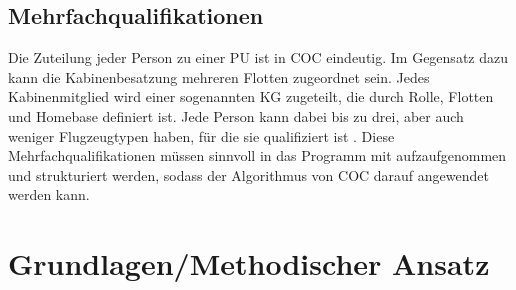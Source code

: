 \documentclass [12pt, a4paper, oneside, titlepage, ngerman]{article}
\begin{document}
\subsection{Mehrfachqualifikationen}
Die Zuteilung jeder Person zu einer \ac{PU} ist in \ac{COC} eindeutig.
Im Gegensatz dazu kann die Kabinenbesatzung mehreren Flotten zugeordnet sein. Jedes Kabinenmitglied wird einer sogenannten \ac{KG} zugeteilt, die durch Rolle, Flotten und Homebase definiert ist. Jede Person kann dabei bis zu drei, aber auch weniger Flugzeugtypen haben, für die sie qualifiziert ist \cite[vgl.][]{Gespraech2}. Diese Mehrfachqualifikationen müssen sinnvoll in das Programm mit aufzaufgenommen und strukturiert werden, sodass der Algorithmus von \ac{COC} darauf angewendet werden kann.


\newpage

\section {Grundlagen/Methodischer Ansatz}
\end{document}
